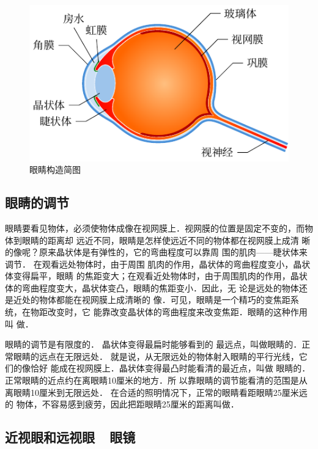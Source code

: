 \begin{figure}[htbp]
	\centering
	\includegraphics{fig/C/5-49.pdf}
	\caption{眼睛构造简图}\label{fig_C_5-49}
\end{figure}


\subsection{眼睛的调节}

眼睛要看见物体，必须使物体成像在视网膜上．视网膜的位置是固定不变的，而物体到眼睛的距离却
远近不同，眼睛是怎样使远近不同的物体都在视网膜上成清
晰的像呢？原来晶状体是有弹性的，它的弯曲程度可以靠周
围的肌肉——睫状体来调节．
在观看远处物体时，由于周围
肌肉的作用，晶状体的弯曲程度变小，晶状体变得扁平，眼睛
的焦距变大；在观看近处物体时，由于周围肌肉的作用，晶状
体的弯曲程度变大，晶状体变凸，眼睛的焦距变小．因此，无
论是远处的物体还是近处的物体都能在视网膜上成清晰的
像．可见，眼睛是一个精巧的变焦距系统，在物距改变时，它
能靠改变晶状体的弯曲程度来改变焦距．眼睛的这种作用叫
做．

眼睛的调节是有限度的．
晶状体变得最扁时能够看到的
最远点，叫做眼睛的．正常眼睛的远点在无限远处．
就是说，从无限远处的物体射入眼睛的平行光线，它们的像恰好
能成在视网膜上．晶状体变得最凸时能看清的最近点，叫做
眼睛的．正常眼睛的近点约在离眼睛10厘米的地方．所
以靠眼睛的调节能看清的范围是从离眼睛10厘米到无限远处．
在合适的照明情况下，正常的眼睛看距眼睛25厘米远的
物体，不容易感到疲劳，因此把距眼睛25厘米的距离叫做．

\subsection{近视眼和远视眼~~眼镜}


